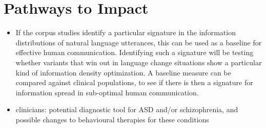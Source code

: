 \documentclass[11pt]{article}
\begin{document}
\section{Pathways to Impact}

\begin{itemize}
	\item If the corpus studies identify a particular signature in the information distributions of natural language utterances, this can be used as a baseline for effective human communication. Identifying such a signature will be testing whether variants that win out in language change situations show a particular kind of information density optimization. A baseline measure can be compared against clinical populations, to see if there is then a signature for information spread in sub-optimal human communication. 
	\item clinicians: potential diagnostic tool for ASD and/or schizophrenia, and possible changes to behavioural therapies for these conditions
\end{itemize}








\end{document}
